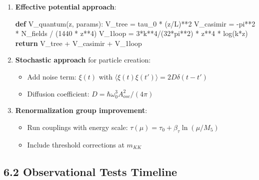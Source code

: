 \documentclass[
  11pt,
]{report}
\newenvironment{Shaded}{}{}
\newcommand{\ControlFlowTok}[1]{\textcolor[rgb]{0.00,0.44,0.13}{\textbf{#1}}}
\newcommand{\DecValTok}[1]{\textcolor[rgb]{0.25,0.63,0.44}{#1}}
\newcommand{\KeywordTok}[1]{\textcolor[rgb]{0.00,0.44,0.13}{\textbf{#1}}}
\newcommand{\NormalTok}[1]{#1}
\newcommand{\OperatorTok}[1]{\textcolor[rgb]{0.40,0.40,0.40}{#1}}
\providecommand{\tightlist}{%
  \setlength{\itemsep}{0pt}\setlength{\parskip}{0pt}}
\begin{document}
\begin{enumerate}
\def\labelenumi{\arabic{enumi}.}
\item
  \textbf{Effective potential approach}:

\begin{Shaded}
\begin{Highlighting}[]
\KeywordTok{def}\NormalTok{ V\_quantum(z, params):}
\NormalTok{    V\_tree }\OperatorTok{=}\NormalTok{ tau\_0 }\OperatorTok{*}\NormalTok{ (z}\OperatorTok{/}\NormalTok{L)}\OperatorTok{**}\DecValTok{2}
\NormalTok{    V\_casimir }\OperatorTok{=} \OperatorTok{{-}}\NormalTok{pi}\OperatorTok{**}\DecValTok{2} \OperatorTok{*}\NormalTok{ N\_fields }\OperatorTok{/}\NormalTok{ (}\DecValTok{1440} \OperatorTok{*}\NormalTok{ z}\OperatorTok{**}\DecValTok{4}\NormalTok{)}
\NormalTok{    V\_1loop }\OperatorTok{=} \DecValTok{3}\OperatorTok{*}\NormalTok{k}\OperatorTok{**}\DecValTok{4}\OperatorTok{/}\NormalTok{(}\DecValTok{32}\OperatorTok{*}\NormalTok{pi}\OperatorTok{**}\DecValTok{2}\NormalTok{) }\OperatorTok{*}\NormalTok{ z}\OperatorTok{**}\DecValTok{4} \OperatorTok{*}\NormalTok{ log(k}\OperatorTok{*}\NormalTok{z)}
    \ControlFlowTok{return}\NormalTok{ V\_tree }\OperatorTok{+}\NormalTok{ V\_casimir }\OperatorTok{+}\NormalTok{ V\_1loop}
\end{Highlighting}
\end{Shaded}
\item
  \textbf{Stochastic approach} for particle creation:

  \begin{itemize}
  \tightlist
  \item
    Add noise term: \(\xi(t)\) with
    \(\langle\xi(t)\xi(t')\rangle = 2D\delta(t-t')\)
  \item
    Diffusion coefficient: \(D = \hbar\omega_0^3 A_{osc}^2/(4\pi)\)
  \end{itemize}
\item
  \textbf{Renormalization group improvement}:

  \begin{itemize}
  \tightlist
  \item
    Run couplings with energy scale:
    \(\tau(\mu) = \tau_0 + \beta_\tau \ln(\mu/M_5)\)
  \item
    Include threshold corrections at \(m_{KK}\)
  \end{itemize}
\end{enumerate}

\subsection{6.2 Observational Tests
Timeline}\label{observational-tests-timeline}
\end{document}
